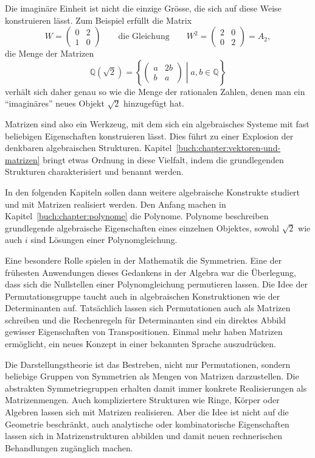 Die imaginäre Einheit ist nicht die einzige Grösse, die sich auf diese
Weise konstruieren lässt.
Zum Beispiel erfüllt die Matrix
\[
W=\begin{pmatrix} 0&2\\1&0 \end{pmatrix}
\qquad\text{die Gleichung}\qquad
W^2 = \begin{pmatrix} 2&0\\0&2\end{pmatrix} = A_2,
\]
die Menge der Matrizen
\[
\mathbb{Q}(\sqrt{2})
=
\left\{\left.
\begin{pmatrix} a&2b\\ b&a\end{pmatrix}
\;\right|\;
a,b\in\mathbb{Q}
\right\}
\]
verhält sich daher genau so wie die Menge der rationalen Zahlen, denen
man ein ``imaginäres'' neues Objekt $\sqrt{2}$ hinzugefügt hat.

Matrizen sind also ein Werkzeug, mit dem sich ein algebraisches Systeme
mit fast beliebigen Eigenschaften konstruieren lässt.
Dies führt zu einer Explosion der denkbaren algebraischen Strukturen.
Kapitel~\ref{buch:chapter:vektoren-und-matrizen} bringt etwas Ordnung
in diese Vielfalt, indem die grundlegenden Strukturen charakterisiert
und benannt werden.

In den folgenden Kapiteln sollen dann weitere algebraische Konstrukte
studiert und mit Matrizen realisiert werden.
Den Anfang machen in Kapitel~\ref{buch:chapter:polynome} die Polynome.
Polynome beschreiben grundlegende algebraische Eigenschaften eines
einzelnen Objektes, sowohl $\sqrt{2}$ wie auch $i$ sind Lösungen einer
Polynomgleichung.

Eine besondere Rolle spielen in der Mathematik die Symmetrien.
Eine der frühesten Anwendungen dieses Gedankens in der Algebra war
die Überlegung, dass sich die Nullstellen einer Polynomgleichung
permutieren lassen.
Die Idee der Permutationsgruppe taucht auch in algebraischen Konstruktionen
wie der Determinanten auf.
Tatsächlich lassen sich Permutationen auch als Matrizen schreiben
und die Rechenregeln für Determinanten sind ein direktes Abbild
gewisser Eigenschaften von Transpositionen.
Einmal mehr haben Matrizen ermöglicht, ein neues Konzept in einer
bekannten Sprache auszudrücken.

Die Darstellungstheorie ist das Bestreben, nicht nur Permutationen,
sondern beliebige Gruppen von Symmetrien als Mengen von Matrizen
darzustellen.
Die abstrakten Symmetriegruppen erhalten damit immer konkrete 
Realisierungen als Matrizenmengen.
Auch kompliziertere Strukturen wie Ringe, Körper oder Algebren
lassen sich mit Matrizen realisieren.
Aber die Idee ist nicht auf die Geometrie beschränkt, auch analytische
oder kombinatorische Eigenschaften lassen sich in Matrizenstrukturen
abbilden und damit neuen rechnerischen Behandlungen zugänglich
machen.

